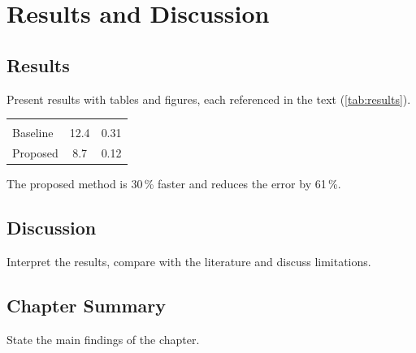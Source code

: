 \chapter{Results and Discussion}\label{ch:results}

\section{Results}
Present results with tables and figures, each referenced in the text (\cref{tab:results}).
\begin{center}\atlrows
  \label{tab:results}
  \begin{tabular}{@{}lS[table-format=2.1]S[table-format=1.2]@{}}
     & {} & {}\\
    Baseline & 12.4 & 0.31 \\
    Proposed & 8.7 & 0.12 \\
  \end{tabular}
\end{center}

\begin{resultbox}
The proposed method is \num{30}\,\% faster and reduces the error by \num{61}\,\%.
\end{resultbox}

\section{Discussion}
Interpret the results, compare with the literature and discuss limitations.

\section{Chapter Summary}
State the main findings of the chapter.
